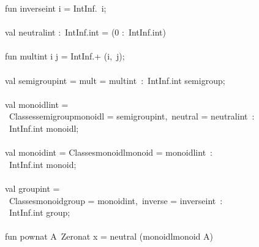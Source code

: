 \begin{isabellebody}
\begin{isamarkuptext}
\hspace*{0pt}fun inverse{}int i = IntInf.{}~i;\\
\hspace*{0pt}\\
\hspace*{0pt}val neutral{}int :~IntInf.int = (0 :~IntInf.int)\\
\hspace*{0pt}\\
\hspace*{0pt}fun mult{}int i j = IntInf.+ (i,~j);\\
\hspace*{0pt}\\
\hspace*{0pt}val semigroup{}int = {}mult = mult{}int{}~:~IntInf.int semigroup;\\
\hspace*{0pt}\\
\hspace*{0pt}val monoidl{}int =\\
\hspace*{0pt} ~{}Classes{}{}semigroup{}monoidl = semigroup{}int,~neutral = neutral{}int{}~:\\
\hspace*{0pt} ~IntInf.int monoidl;\\
\hspace*{0pt}\\
\hspace*{0pt}val monoid{}int = {}Classes{}{}monoidl{}monoid = monoidl{}int{}~:\\
\hspace*{0pt} ~IntInf.int monoid;\\
\hspace*{0pt}\\
\hspace*{0pt}val group{}int =\\
\hspace*{0pt} ~{}Classes{}{}monoid{}group = monoid{}int,~inverse = inverse{}int{}~:\\
\hspace*{0pt} ~IntInf.int group;\\
\hspace*{0pt}\\
\hspace*{0pt}fun pow{}nat A{}~Zero{}nat x = neutral (monoidl{}monoid A{})\\

\end{isamarkuptext}
\end{isabellebody}
